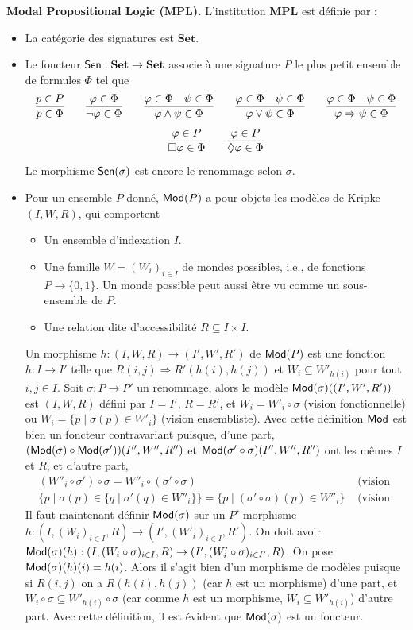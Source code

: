 \documentclass[11pt,a4paper]{report}
\newcommand{\ph}{\varphi}
\newcommand{\itemz}{\item[$\triangleright$]}
\newcommand{\gr}{\textbf}
\newcommand{\info}[1]{\text{{\fontfamily{lmss}\selectfont #1}}}
\newcommand{\Mod}{\info{Mod}}
\newcommand{\Sen}{\info{Sen}}
\newcommand{\1}{\mathbbm{1}}
\begin{document}
\gr{Modal Propositional Logic ($\gr{MPL}$).} L'institution $\gr{MPL}$ est définie par :
\begin{itemize}
\itemz La catégorie des signatures est $\gr{Set}$.
\itemz Le foncteur $\Sen : \gr{Set} \to \gr{Set}$ associe à une signature $P$ le plus petit ensemble de formules $\Phi$ tel que
$$
\infer{p \in \Phi}{p \in P}
\qquad
\infer{\neg \ph \in \Phi}{\ph \in \Phi}
\qquad
\infer{\ph \wedge \psi \in \Phi}{\ph \in \Phi & \psi \in \Phi }
\qquad
\infer{\ph \vee \psi \in \Phi}{\ph \in \Phi & \psi \in \Phi }
\qquad
\infer{\ph \Rightarrow \psi \in \Phi}{\ph \in \Phi & \psi \in \Phi }
$$
$$
\infer{\square \ph \in \Phi}{\ph \in P}
\qquad
\infer{\lozenge \ph \in \Phi}{\ph \in P}
$$
Le morphisme $\Sen(\sigma)$ est encore le renommage selon $\sigma$.
\itemz Pour un ensemble $P$ donné, $\Mod(P)$ a pour objets les modèles de Kripke $(I,W,R)$, qui comportent
\begin{itemize}
\setlength\itemsep{-0.3em}
\item Un ensemble d'indexation $I$.
\item Une famille $W = (W_i)_{i\in I}$ de mondes possibles, i.e., de fonctions $P \to \{ 0,1 \}$. Un monde possible peut aussi être vu comme un sous-ensemble de $P$.
\item Une relation dite d'accessibilité $R \subseteq I \times I$.
\end{itemize}
Un morphisme $h : (I,W,R) \to (I',W',R')$ de $\Mod(P)$ est une fonction $h : I \to I'$ telle que $R(i,j) \Rightarrow R'(h(i),h(j))$ et $W_i \subseteq W'_{h(i)}$ pour tout $i,j \in I$. Soit $\sigma : P \to P'$ un renommage, alors le modèle $\Mod(\sigma)((I',W',R'))$ est $(I,W,R)$ défini par $I = I'$, $R = R'$, et $W_i = W'_i \circ \sigma$ (vision fonctionnelle) ou $W_i = \{ p \mid \sigma(p) \in W'_i \}$ (vision ensembliste). Avec cette définition $\Mod$ est bien un foncteur contravariant puisque, d'une part, $(\Mod(\sigma) \circ \Mod(\sigma')) (I'',W'',R'')$ et $\Mod(\sigma' \circ \sigma)(I'',W'',R'')$ ont les mêmes $I$ et $R$, et d'autre part,
\begin{align*}
&(W''_i \circ \sigma') \circ \sigma = W''_i \circ (\sigma' \circ \sigma) &\text{ (vision fonctionnelle)}\\
&  \{ p \mid \sigma(p) \in \{ q \mid \sigma'(q) \in W''_i \}\} = \{ p \mid (\sigma' \circ \sigma)(p) \in W''_i \} & \text{ (vision ensembliste)}
\end{align*}
Il faut maintenant définir $\Mod(\sigma)$ sur un $P'$-morphisme $h : (I,(W_i)_{i\in I},R) \to (I',(W'_i)_{i\in I},R')$. On doit avoir $\Mod(\sigma)(h) : (I,(W_i \circ \sigma)_{i\in I},R) \to (I',(W'_i \circ \sigma)_{i\in I'},R)$. On pose $\Mod(\sigma)(h)(i) = h(i)$. Alors il s'agit bien d'un morphisme de modèles puisque si $R(i,j)$ on a $R(h(i),h(j))$ (car $h$ est un morphisme) d'une part, et $W_i \circ \sigma \subseteq W'_{h(i)} \circ \sigma$ (car comme $h$ est un morphisme, $W_i \subseteq W'_{h(i)}$) d'autre part. Avec cette définition, il est évident que $\Mod(\sigma)$ est un foncteur.

\end{itemize}
\end{document}
